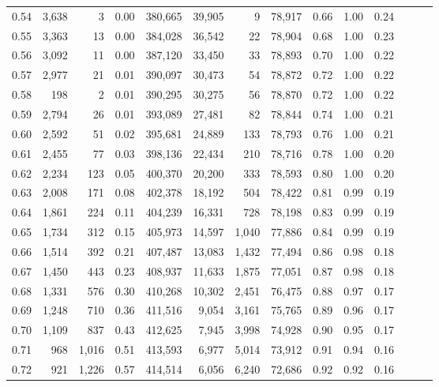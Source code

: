 \begin{tabular}{rrrrrrrrrrrrrr}
0.54 &  3,638 &      3 &  0.00 &  380,665 &   39,905 &       9 &  78,917 &  0.66 &  1.00 &      0.24 \\
0.55 &  3,363 &     13 &  0.00 &  384,028 &   36,542 &      22 &  78,904 &  0.68 &  1.00 &      0.23 \\
0.56 &  3,092 &     11 &  0.00 &  387,120 &   33,450 &      33 &  78,893 &  0.70 &  1.00 &      0.22 \\
0.57 &  2,977 &     21 &  0.01 &  390,097 &   30,473 &      54 &  78,872 &  0.72 &  1.00 &      0.22 \\
0.58 &    198 &      2 &  0.01 &  390,295 &   30,275 &      56 &  78,870 &  0.72 &  1.00 &      0.22 \\
0.59 &  2,794 &     26 &  0.01 &  393,089 &   27,481 &      82 &  78,844 &  0.74 &  1.00 &      0.21 \\
0.60 &  2,592 &     51 &  0.02 &  395,681 &   24,889 &     133 &  78,793 &  0.76 &  1.00 &      0.21 \\
0.61 &  2,455 &     77 &  0.03 &  398,136 &   22,434 &     210 &  78,716 &  0.78 &  1.00 &      0.20 \\
0.62 &  2,234 &    123 &  0.05 &  400,370 &   20,200 &     333 &  78,593 &  0.80 &  1.00 &      0.20 \\
0.63 &  2,008 &    171 &  0.08 &  402,378 &   18,192 &     504 &  78,422 &  0.81 &  0.99 &      0.19 \\
0.64 &  1,861 &    224 &  0.11 &  404,239 &   16,331 &     728 &  78,198 &  0.83 &  0.99 &      0.19 \\
0.65 &  1,734 &    312 &  0.15 &  405,973 &   14,597 &   1,040 &  77,886 &  0.84 &  0.99 &      0.19 \\
0.66 &  1,514 &    392 &  0.21 &  407,487 &   13,083 &   1,432 &  77,494 &  0.86 &  0.98 &      0.18 \\
0.67 &  1,450 &    443 &  0.23 &  408,937 &   11,633 &   1,875 &  77,051 &  0.87 &  0.98 &      0.18 \\
0.68 &  1,331 &    576 &  0.30 &  410,268 &   10,302 &   2,451 &  76,475 &  0.88 &  0.97 &      0.17 \\
0.69 &  1,248 &    710 &  0.36 &  411,516 &    9,054 &   3,161 &  75,765 &  0.89 &  0.96 &      0.17 \\
0.70 &  1,109 &    837 &  0.43 &  412,625 &    7,945 &   3,998 &  74,928 &  0.90 &  0.95 &      0.17 \\
0.71 &    968 &  1,016 &  0.51 &  413,593 &    6,977 &   5,014 &  73,912 &  0.91 &  0.94 &      0.16 \\
0.72 &    921 &  1,226 &  0.57 &  414,514 &    6,056 &   6,240 &  72,686 &  0.92 &  0.92 &      0.16 \\

\end{tabular}
